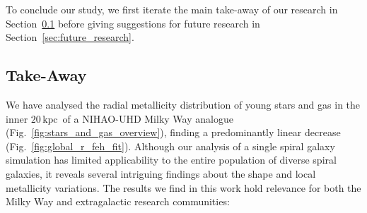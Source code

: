 \documentclass[twocolumn,apj,numberedappendix,appendixfloats,twocolappendix]{openjournal}
\newcommand{\nihaoRmax}{$20\,\mathrm{kpc}$}
\begin{document}
\begin{CJK*}{UTF8}{gbsn}
To conclude our study, we first iterate the main take-away of our research in Section~\ref{sec:take_away} before giving suggestions for future research in Section~\ref{sec:future_research}.

\subsection{Take-Away} \label{sec:take_away}

We have analysed the radial metallicity distribution of young stars and gas in the inner \nihaoRmax\ of a NIHAO-UHD Milky Way analogue (Fig.~\ref{fig:stars_and_gas_overview}), finding a predominantly linear decrease (Fig.~\ref{fig:global_r_feh_fit}). Although our analysis of a single spiral galaxy simulation has limited applicability to the entire population of diverse spiral galaxies, it reveals several intriguing findings about the shape and local metallicity variations. The results we find in this work hold relevance for both the Milky Way and extragalactic research communities:


\end{CJK*}
\end{document}
